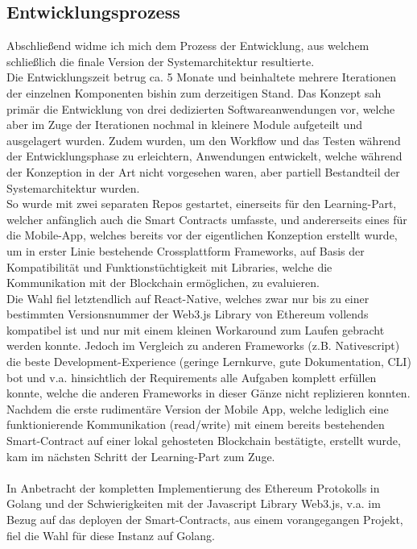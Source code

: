 \subsection{Entwicklungsprozess}
Abschließend widme ich mich dem Prozess der Entwicklung, aus welchem schließlich die finale Version der Systemarchitektur resultierte. \\
Die Entwicklungszeit betrug ca. 5 Monate und beinhaltete mehrere Iterationen der einzelnen Komponenten bishin zum derzeitigen Stand. Das Konzept sah primär die Entwicklung von drei dedizierten Softwareanwendungen vor, welche aber im Zuge der Iterationen nochmal in kleinere Module aufgeteilt und ausgelagert wurden. Zudem wurden, um den Workflow und das Testen während der Entwicklungsphase zu erleichtern, Anwendungen entwickelt, welche während der Konzeption in der Art nicht vorgesehen waren, aber partiell Bestandteil der Systemarchitektur wurden. \\
So wurde mit zwei separaten Repos gestartet, einerseits für den Learning-Part, welcher anfänglich auch die Smart Contracts umfasste, und andererseits eines für die Mobile-App, welches bereits vor der eigentlichen Konzeption erstellt wurde, um in erster Linie bestehende Crossplattform Frameworks, auf Basis der Kompatibilität und Funktionstüchtigkeit mit Libraries, welche die Kommunikation mit der Blockchain ermöglichen, zu evaluieren. \\
Die Wahl fiel letztendlich auf React-Native, welches zwar nur bis zu einer bestimmten Versionsnummer der Web3.js Library von Ethereum vollends kompatibel ist und nur mit einem kleinen Workaround zum Laufen gebracht werden konnte. 
Jedoch im Vergleich zu anderen Frameworks (z.B. Nativescript) die beste Development-Experience (geringe Lernkurve, gute Dokumentation, CLI) bot und v.a. hinsichtlich der Requirements alle Aufgaben komplett erfüllen konnte, welche die anderen Frameworks in dieser Gänze nicht replizieren konnten. \\
Nachdem die erste rudimentäre Version der Mobile App, welche lediglich eine funktionierende Kommunikation (read/write) mit einem bereits bestehenden Smart-Contract auf einer lokal gehosteten Blockchain bestätigte, erstellt wurde, kam im nächsten Schritt der Learning-Part zum Zuge. \\\\
In Anbetracht der kompletten Implementierung des Ethereum Protokolls in Golang und der Schwierigkeiten mit der Javascript Library Web3.js, v.a. im Bezug auf das deployen der Smart-Contracts, aus einem vorangegangen Projekt, fiel die Wahl für diese Instanz auf Golang. \\
